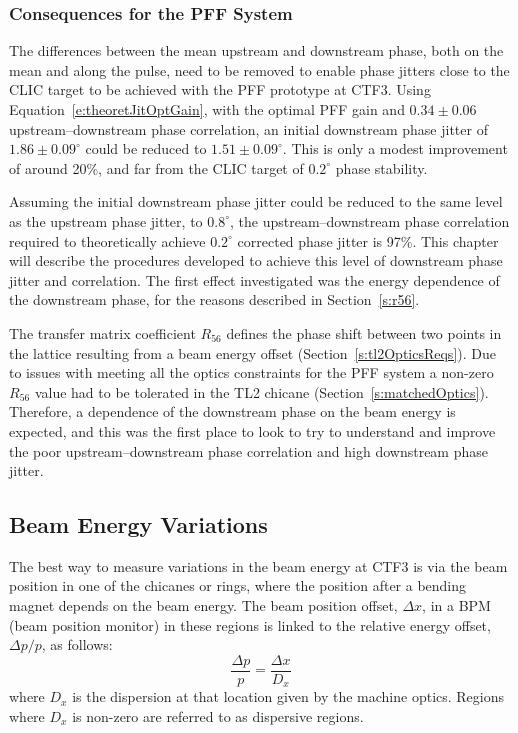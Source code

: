 \subsubsection{Consequences for the PFF System}

The differences between the mean upstream and downstream phase, both on the mean and along the pulse, need to be removed to enable phase jitters close to the CLIC target to be achieved with the PFF prototype at CTF3. Using Equation~\ref{e:theoretJitOptGain}, with the optimal PFF gain and \(0.34\pm0.06\) upstream--downstream phase correlation, an initial downstream phase jitter of \(1.86\pm0.09^\circ\) could be reduced to \(1.51\pm0.09^\circ\). This is only a modest improvement of around 20\%, and far from the CLIC target of \(0.2^\circ\) phase stability. %

Assuming the initial downstream phase jitter could be reduced to the same level as the upstream phase jitter, to \(0.8^\circ\), the upstream--downstream phase correlation required to theoretically achieve \(0.2^\circ\) corrected phase jitter is 97\%. This chapter will describe the procedures developed to achieve this level of downstream phase jitter and correlation. The first effect investigated was the energy dependence of the downstream phase, for the reasons described in Section~\ref{s:r56}.


The transfer matrix coefficient \(R_{56}\) defines the phase shift between two points in the lattice resulting from a beam energy offset (Section~\ref{s:tl2OpticsReqs}). Due to issues with meeting all the optics constraints for the PFF system a non-zero \(R_{56}\) value had to be tolerated in the TL2 chicane (Section~\ref{s:matchedOptics}).  Therefore, a dependence of the downstream phase on the beam energy is expected, and this was the first place to look to try to understand and improve the poor upstream--downstream phase correlation and high downstream phase jitter.

\subsection{Beam Energy Variations}
\label{ss:energyVariations}

The best way to measure variations in the beam energy at CTF3 is via the beam position in one of the chicanes or rings, where the position after a bending magnet depends on the beam energy. The beam position offset, \(\Delta x\), in a BPM (beam position monitor) in these regions is linked to the relative energy offset, \(\Delta p / p\), as follows:
\begin{equation}
\frac{\Delta p}{p} = \frac{\Delta x}{D_x}
\label{e:dxToEn}
\end{equation}
where \(D_{x}\) is the dispersion at that location given by the machine optics. Regions where \(D_{x}\) is non-zero are referred to as dispersive regions.

